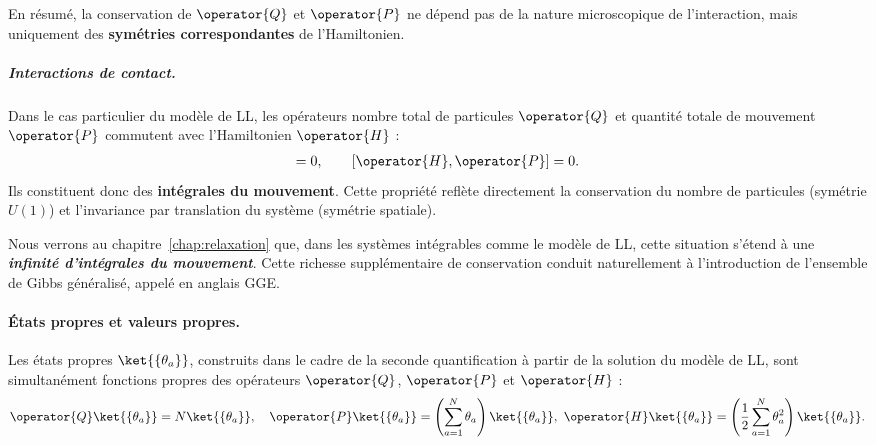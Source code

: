 En résumé, la conservation de $\operator{Q}$ et $\operator{P}$ ne dépend pas de la nature microscopique de l’interaction, mais uniquement des \textbf{symétries correspondantes} de l’Hamiltonien.  

\medskip

\subparagraph{Interactions de contact.}

Dans le cas particulier du modèle de \gls{LL}, les opérateurs nombre total de particules $\operator{Q}$ et quantité totale de mouvement $\operator{P}$ commutent avec l’Hamiltonien $\operator{H}$ :  
\begin{eqnarray}
[ \operator{H} , \operator{Q} ] = 0, 
\qquad 
[ \operator{H} , \operator{P} ] = 0.
\end{eqnarray}
Ils constituent donc des \textbf{intégrales du mouvement}. Cette propriété reflète directement la conservation du nombre de particules (symétrie $U(1)$) et l’invariance par translation du système (symétrie spatiale).  

\begin{mdframed}[
	linewidth=0.5pt, 
	backgroundcolor=gray!5, 
	roundcorner=50pt,	
	innerleftmargin=5pt,
    innerrightmargin=5pt,
    innertopmargin=5pt,
    innerbottommargin=2pt,
    leftmargin=2pt,
    rightmargin=2pt
	]	
	Nous verrons au chapitre~\ref{chap:relaxation} que, dans les systèmes intégrables comme le modèle de \gls{LL}, cette situation s’étend à une {\bf \em infinité d’intégrales du mouvement}. 
	Cette richesse supplémentaire de conservation conduit naturellement à l’introduction de l’ensemble de Gibbs généralisé, appelé en anglais \gls{GGE}.

\end{mdframed}


\paragraph{États propres et valeurs propres.}
Les états propres $\ket{\{\theta_a\}}$, construits dans le cadre de la seconde quantification à partir de la solution du modèle de \gls{LL}, sont simultanément fonctions propres des opérateurs $\operator{Q}$, $\operator{P}$ et $\operator{H}$ :
\begin{eqnarray}\label{chap1:eq.Q.P.K.theta.1}
\operator{Q} \ket{\{\theta_a\}} = N \ket{\{\theta_a\}}, \quad
\operator{P} \ket{\{\theta_a\}} = \left( \sum_{a=1}^N \theta_a \right) \ket{\{\theta_a\}}, \
\operator{H} \ket{\{\theta_a\}} = \left( \frac{1}{2} \sum_{a=1}^N \theta_a^2 \right) \ket{\{\theta_a\}}.
\end{eqnarray}

